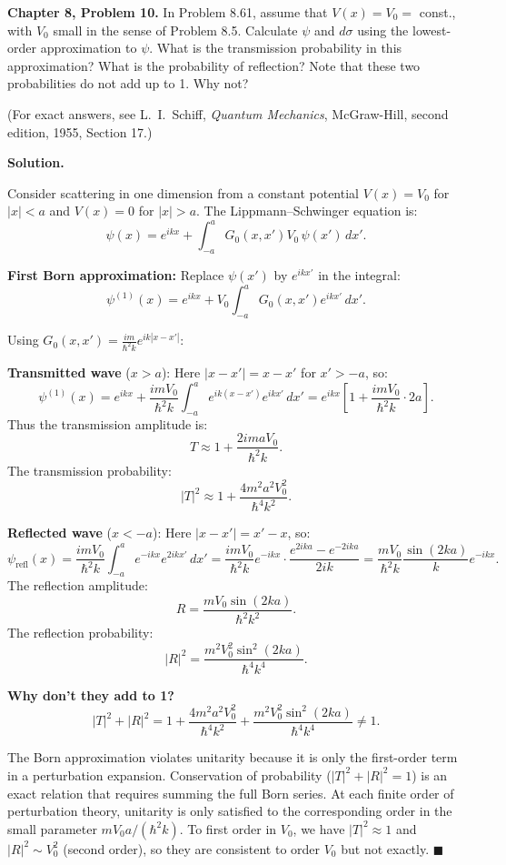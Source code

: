 \documentclass[12pt]{article}
\begin{document}
\textbf{Chapter 8, Problem 10.} In Problem 8.61, assume that $V(x) = V_0 =$ const., with $V_0$ small in the sense of Problem 8.5. Calculate $\psi$ and $d\sigma$ using the lowest-order approximation to $\psi$. What is the transmission probability in this approximation? What is the probability of reflection? Note that these two probabilities do not add up to 1. Why not?

(For exact answers, see L.\ I.\ Schiff, \textit{Quantum Mechanics}, McGraw-Hill, second edition, 1955, Section 17.)

\bigskip
\textbf{Solution.}

Consider scattering in one dimension from a constant potential $V(x) = V_0$ for $|x|<a$ and $V(x)=0$ for $|x|>a$. The Lippmann--Schwinger equation is:
\[
\psi(x) = e^{ikx} + \int_{-a}^{a} G_0(x,x')V_0\,\psi(x')\,dx'.
\]

\textbf{First Born approximation:} Replace $\psi(x')$ by $e^{ikx'}$ in the integral:
\[
\psi^{(1)}(x) = e^{ikx} + V_0\int_{-a}^{a} G_0(x,x')e^{ikx'}\,dx'.
\]

Using $G_0(x,x') = \frac{im}{\hbar^2 k}e^{ik|x-x'|}$:

\textbf{Transmitted wave} ($x > a$): Here $|x-x'| = x-x'$ for $x'>-a$, so:
\[
\psi^{(1)}(x) = e^{ikx} + \frac{imV_0}{\hbar^2 k}\int_{-a}^{a} e^{ik(x-x')}e^{ikx'}\,dx' = e^{ikx}\left[1+\frac{imV_0}{\hbar^2 k}\cdot 2a\right].
\]
Thus the transmission amplitude is:
\[
T \approx 1 + \frac{2imaV_0}{\hbar^2 k}.
\]
The transmission probability:
\[
|T|^2 \approx 1 + \frac{4m^2a^2V_0^2}{\hbar^4 k^2}.
\]

\textbf{Reflected wave} ($x < -a$): Here $|x-x'| = x'-x$, so:
\[
\psi_{\text{refl}}(x) = \frac{imV_0}{\hbar^2 k}\int_{-a}^{a}e^{-ikx}e^{2ikx'}\,dx' = \frac{imV_0}{\hbar^2 k}e^{-ikx}\cdot\frac{e^{2ika}-e^{-2ika}}{2ik} = \frac{mV_0}{\hbar^2 k}\frac{\sin(2ka)}{k}e^{-ikx}.
\]
The reflection amplitude:
\[
R = \frac{mV_0\sin(2ka)}{\hbar^2 k^2}.
\]
The reflection probability:
\[
|R|^2 = \frac{m^2V_0^2\sin^2(2ka)}{\hbar^4 k^4}.
\]

\textbf{Why don't they add to 1?}
\[
|T|^2 + |R|^2 = 1 + \frac{4m^2a^2V_0^2}{\hbar^4 k^2} + \frac{m^2V_0^2\sin^2(2ka)}{\hbar^4 k^4} \neq 1.
\]

The Born approximation violates unitarity because it is only the first-order term in a perturbation expansion. Conservation of probability ($|T|^2+|R|^2=1$) is an exact relation that requires summing the full Born series. At each finite order of perturbation theory, unitarity is only satisfied to the corresponding order in the small parameter $mV_0 a/(\hbar^2 k)$. To first order in $V_0$, we have $|T|^2\approx 1$ and $|R|^2\sim V_0^2$ (second order), so they are consistent to order $V_0$ but not exactly. $\blacksquare$
\end{document}
